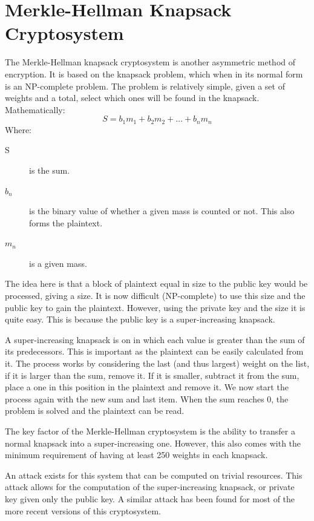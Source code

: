 	\section{Merkle-Hellman Knapsack Cryptosystem}
		The Merkle-Hellman knapsack cryptosystem is another asymmetric method of encryption.
		It is based on the knapsack problem, which when in its normal form is an NP-complete problem.
		The problem is relatively simple, given a set of weights and a total, select which ones will be found in the knapsack.
		Mathematically:
		\[S = b_1m_1 + b_2m_2 +\ldots+ b_nm_n\]
		Where:
		\begin{description}
			\item[S] is the sum.
			\item[$b_n$] is the binary value of whether a given mass is counted or not.
				This also forms the plaintext.
			\item[$m_n$] is a given mass.
		\end{description}

		The idea here is that a block of plaintext equal in size to the public key would be processed, giving a size.
		It is now difficult (NP-complete) to use this size and the public key to gain the plaintext.
		However, using the private key and the size it is quite easy.
		This is because the public key is a super-increasing knapsack.

		A super-increasing knapsack is on in which each value is greater than the sum of its predecessors.
		This is important as the plaintext can be easily calculated from it.
		The process works by considering the last (and thus largest) weight on the list, if it is larger than the sum, remove it.
		If it is smaller, subtract it from the sum, place a one in this position in the plaintext and remove it.
		We now start the process again with the new sum and last item.
		When the sum reaches 0, the problem is solved and the plaintext can be read.

		The key factor of the Merkle-Hellman cryptosystem is the ability to transfer a normal knapsack into a super-increasing one.
		However, this also comes with the minimum requirement of having at least 250 weights in each knapsack.

		An attack exists for this system that can be computed on trivial resources\cite{BrokenKnapsack}.
		This attack allows for the computation of the super-increasing knapsack, or private key given only the public key.
		A similar attack has been found for most of the more recent versions of this cryptosystem.

